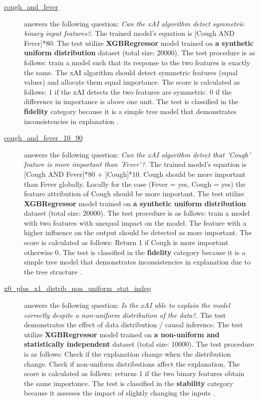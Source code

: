 \begin{description}



\item[\href{https://github.com/Karim-53/Compare-xAI/tree/main/tests/cough_and_fever.py}{cough\_and\_fever}] answers the following question: \emph{Can the xAI algorithm detect symmetric binary input features?}.
The trained model's equation is [Cough AND Fever]*80.
 The test utilize \textbf{XGBRegressor} model trained on \textbf{a synthetic uniform distribution} dataset (total size: 20000).
 The test procedure is as follows: train a model such that its response to the two features is exactly the same. The xAI algorithm should detect symmetric features (equal values) and allocate them equal importance.
 The score is calculated as follows: 1 if the xAI detects the two features are symmetric. 0 if the difference in importance is above one unit.
 The test is classified in the \textbf{fidelity} category because it is a simple tree model that demonstrates inconsistencies in explanation \citep{lundberg2018consistent}.


\item[\href{https://github.com/Karim-53/Compare-xAI/tree/main/tests/cough_and_fever_10_90.py}{cough\_and\_fever\_10\_90}] answers the following question: \emph{Can the xAI algorithm detect that 'Cough' feature is more important than 'Fever'?}.
The trained model's equation is [Cough AND Fever]*80 + [Cough]*10. Cough should be more important than Fever globally. Locally for the case (Fever = yes, Cough = yes) the feature attribution of Cough should be more important.
 The test utilize \textbf{XGBRegressor} model trained on \textbf{a synthetic uniform distribution} dataset (total size: 20000).
 The test procedure is as follows: train a model with two features with unequal impact on the model. The feature with a higher influence on the output should be detected as more important.
 The score is calculated as follows: Return 1 if Cough is more important otherwise 0.
 The test is classified in the \textbf{fidelity} category because it is a simple tree model that demonstrates inconsistencies in explanation due to the tree structure \citep{lundberg2018consistent}.


\item[\href{https://github.com/Karim-53/Compare-xAI/tree/main/tests/x0_plus_x1.py}{x0\_plus\_x1\_distrib\_non\_uniform\_stat\_indep}] answers the following question: \emph{Is the xAI able to explain the model correctly despite a non-uniform distribution of the data?}.
The test demonstrates the effect of data distribution / causal inference.
 The test utilize \textbf{XGBRegressor} model trained on \textbf{a non-uniform and statistically independent} dataset (total size: 10000).
 The test procedure is as follows: Check if the explanation change when the distribution change. Check if non-uniform distributions affect the explanation.
 The score is calculated as follows: returns 1 if the two binary features obtain the same importance.
 The test is classified in the \textbf{stability} category because it assesses the impact of slightly changing the inputs \citep{janzing2020feature}.



\end{description}
